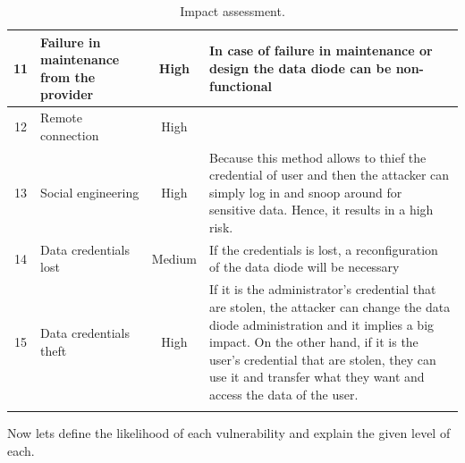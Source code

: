 \documentclass[a4paper,10pt]{article}
\begin{document}
\begin{longtable}{|c|p{2.5cm}|c|p{10cm}|}
\hline
11 & Failure in maintenance from the provider & High & In case of failure in maintenance or design the data diode can be non-functional\\
\hline
12 & Remote connection & High & \\
\hline
13 & Social engineering  & High & Because this method allows to thief the credential of user and then the attacker can simply log in and snoop around for sensitive data. Hence, it results in a high risk. \\
\hline
14 & Data credentials lost & Medium & If the credentials is lost, a reconfiguration of the data diode will be necessary \\
\hline
15 & Data credentials theft & High & If it is the administrator's credential that are stolen, the attacker can change the data diode administration and it implies a big impact. On the other hand, if it is the user's credential that are stolen, they can use it and transfer what they want and access the data of the user.  \\
\hline
\caption{Impact assessment.}
\label{tab:impact}
\end{longtable}

Now lets define the likelihood of each vulnerability and explain the given level of each.
\end{document}
